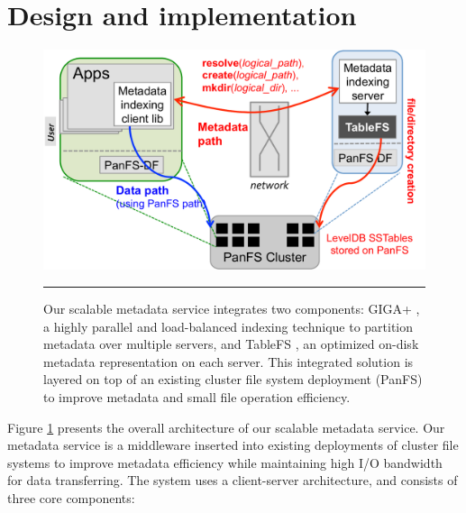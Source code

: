 \section{Design and implementation}

\begin{figure}[t]   %
\centerline{\includegraphics[scale=0.4]{./figs/giga-impl-leveldb-clusterfs}}
\vspace{10pt}
\caption{\textsf{\footnotesize
Our scalable metadata service integrates two components: GIGA+ \cite{GIGA11},
a highly parallel and load-balanced indexing technique 
to partition metadata over multiple servers, and TableFS \cite{TableFS},
an optimized on-disk metadata representation on each server.
This integrated solution is layered on top of an existing cluster
file system deployment (PanFS) to improve metadata
and small file operation efficiency.
}}
\hrule
\label{fig:design}
\end{figure}       %

Figure \ref{fig:design} presents the overall architecture of our scalable
metadata service. Our metadata service is a middleware inserted into
existing deployments of cluster file systems to improve metadata efficiency
while maintaining high I/O bandwidth for data transferring.
The system uses a client-server architecture,
and consists of three core components:

